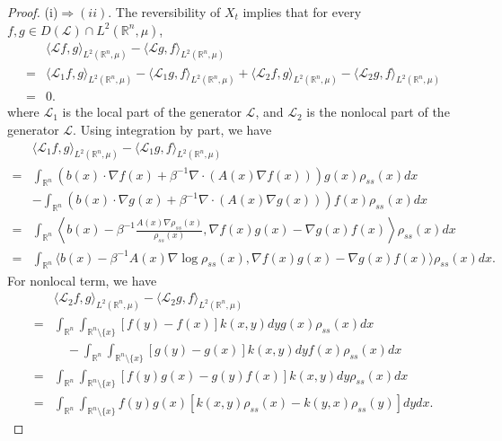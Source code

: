 \documentclass[10pt,a4paper]{amsart}
\begin{document}
\begin{proof}
(i)$ \Rightarrow (ii)$. The reversibility of $X_{t}$ implies that for every $f,g \in D(\mathcal{L}) \cap L^2(\mathbb{R}^n, \mu)$,
\begin{align*}
    & \langle \mathcal{L}f,g\rangle_{L^2(\mathbb{R}^n, \mu)} -\langle \mathcal{L}g,f\rangle_{L^2(\mathbb{R}^n, \mu)}  \\
    = &  \langle \mathcal{L}_{1}f,g\rangle_{L^2(\mathbb{R}^n, \mu)}-\langle \mathcal{L}_{1}g,f\rangle_{L^2(\mathbb{R}^n, \mu)} +\langle \mathcal{L}_{2}f,g\rangle_{L^2(\mathbb{R}^n, \mu)}  - \langle \mathcal{L}_{2}g,f\rangle_{L^2(\mathbb{R}^n, \mu)} \\
    = &0.
\end{align*}
where $\mathcal{L}_{1}$ is the local part of the generator $\mathcal{L}$, and $\mathcal{L}_{2}$ is the nonlocal part of the generator $\mathcal{L}$.
Using integration by part, we have
\begin{align*}
    & \langle\mathcal{L}_{1}f,g\rangle_{L^2(\mathbb{R}^n, \mu)}-\langle \mathcal{L}_{1}g,f\rangle_{L^2(\mathbb{R}^n, \mu)} \\
    = & \int_{\mathbb{R}^n} ( b(x)\cdot \nabla f(x) + \beta^{-1} \nabla\cdot (A(x)\nabla f(x))) g(x) \rho_{ss}(x)dx \\
    & - \int_{\mathbb{R}^n} ( b(x)\cdot \nabla g(x) + \beta^{-1} \nabla\cdot (A(x)\nabla g(x))) f(x) \rho_{ss}(x)dx \\
    = & \int_{\mathbb{R}^n} \left\langle b(x) - \beta^{-1}\frac{A(x)\nabla\rho_{ss}(x)}{\rho_{ss}(x)}, \nabla f(x)g(x) - \nabla g(x) f(x) \right\rangle \rho_{ss}(x) dx \\
    = & \int_{\mathbb{R}^n} \langle b(x) - \beta^{-1}A(x)\nabla \log \rho_{ss}(x), \nabla f(x)g(x) - \nabla g(x) f(x)\rangle \rho_{ss}(x) dx.
\end{align*}
For nonlocal term, we have
\begin{align*}
    & \langle \mathcal{L}_{2}f,g\rangle_{L^2(\mathbb{R}^n, \mu)}- \langle \mathcal{L}_{2}g,f\rangle_{L^2(\mathbb{R}^n, \mu)}  \\
    = & \int_{\mathbb{R}^n} \int_{\mathbb{R}^{n}\setminus \{x\}} [f(y) - f(x)] k(x,y)dy g(x)\rho_{ss}(x)dx \\
    & \quad - \int_{\mathbb{R}^n} \int_{\mathbb{R}^{n}\setminus \{x\}} [g(y) - g(x)] k(x,y)dy f(x)\rho_{ss}(x)dx \\
    = & \int_{\mathbb{R}^n} \int_{\mathbb{R}^{n}\setminus \{x\}} [f(y)g(x) - g(y)f(x)] k(x,y)dy \rho_{ss}(x)dx \\
    = & \int_{\mathbb{R}^n} \int_{\mathbb{R}^{n}\setminus \{x\}} f(y)g(x)  [ k(x,y)\rho_{ss}(x) - k(y,x)\rho_{ss}(y)]dy dx.

\end{align*}
\end{proof}
\end{document}

